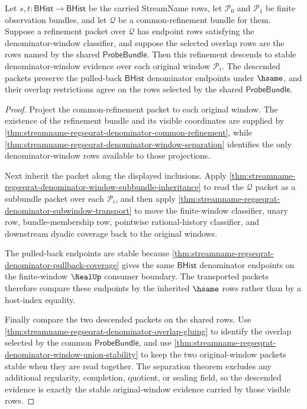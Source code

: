 \begin{theorem}
\label{thm:streamname-regseqrat-denominator-refinement-descent}
Let $s,t:\mathsf{BHist}\to\mathsf{BHist}$ be the carried StreamName rows, let
$\mathcal P_0$ and $\mathcal P_1$ be finite observation bundles, and let
$\mathcal Q$ be a common-refinement bundle for them. Suppose a refinement
packet over $\mathcal Q$ has endpoint rows satisfying the denominator-window
classifier, and suppose the selected overlap rows are the rows named by the
shared $\mathsf{ProbeBundle}$. Then this refinement descends to stable
denominator-window evidence over each original window $\mathcal P_i$. The
descended packets preserve the pulled-back $\mathsf{BHist}$ denominator
endpoints under $\hsame$, and their overlap restrictions agree on the rows
selected by the shared $\mathsf{ProbeBundle}$.
\end{theorem}
\begin{proof}
Project the common-refinement packet to each original window. The existence of
the refinement bundle and its visible coordinates are supplied by
\autoref{thm:streamname-regseqrat-denominator-common-refinement}, while
\autoref{thm:streamname-regseqrat-denominator-window-separation} identifies
the only denominator-window rows available to those projections.

Next inherit the packet along the displayed inclusions. Apply
\autoref{thm:streamname-regseqrat-denominator-window-subbundle-inheritance} to
read the $\mathcal Q$ packet as a subbundle packet over each $\mathcal P_i$,
and then apply
\autoref{thm:streamname-regseqrat-denominator-subwindow-transport} to move the
finite-window classifier, unary row, bundle-membership row, pointwise
rational-history classifier, and downstream dyadic coverage back to the
original windows.

The pulled-back endpoints are stable because
\autoref{thm:streamname-regseqrat-denominator-pullback-coverage} gives the
same $\mathsf{BHist}$ denominator endpoints on the finite-window $\RealUp$
consumer boundary. The transported packets therefore compare these endpoints
by the inherited $\hsame$ rows rather than by a host-index equality.

Finally compare the two descended packets on the shared rows. Use
\autoref{thm:streamname-regseqrat-denominator-overlap-gluing} to identify the
overlap selected by the common $\mathsf{ProbeBundle}$, and use
\autoref{thm:streamname-regseqrat-denominator-window-union-stability} to keep
the two original-window packets stable when they are read together. The
separation theorem excludes any additional regularity, completion, quotient,
or sealing field, so the descended evidence is exactly the stable
original-window evidence carried by those visible rows.
\end{proof}

